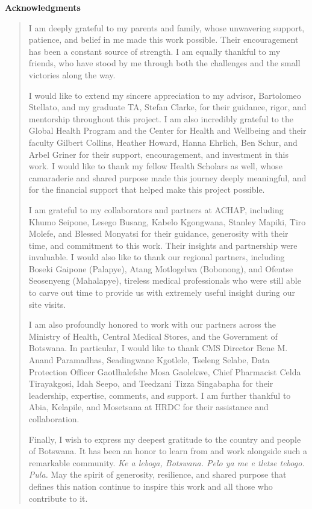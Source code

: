\documentclass{article}
\begin{document}
\begin{center}
\small
\textbf{Acknowledgments}
\end{center}
\begin{quote}
\small
I am deeply grateful to my parents and family, whose unwavering support, patience, and belief in me made this work possible. Their encouragement has been a constant source of strength. I am equally thankful to my friends, who have stood by me through both the challenges and the small victories along the way.

I would like to extend my sincere appreciation to my advisor, Bartolomeo Stellato, and my graduate TA, Stefan Clarke, for their guidance, rigor, and mentorship throughout this project. I am also incredibly grateful to the Global Health Program and the Center for Health and Wellbeing and their faculty Gilbert Collins, Heather Howard, Hanna Ehrlich, Ben Schur, and Arbel Griner for their support, encouragement, and investment in this work. I would like to thank my fellow Health Scholars as well, whose camaraderie and shared purpose made this journey deeply meaningful, and for the financial support that helped make this project possible.

I am grateful to my collaborators and partners at ACHAP, including Khumo Seipone, Lesego Busang, Kabelo Kgongwana, Stanley Mapiki, Tiro Molefe, and Blessed Monyatsi for their guidance, generosity with their time, and commitment to this work. Their insights and partnership were invaluable. I would also like to thank our regional partners, including Boseki Gaipone (Palapye), Atang Motlogelwa (Bobonong), and Ofentse Seosenyeng (Mahalapye), tireless medical professionals who were still able to carve out time to provide us with extremely useful insight during our site visits.

I am also profoundly honored to work with our partners across the Ministry of Health, Central Medical Stores, and the Government of Botswana. In particular, I would like to thank CMS Director Bene M. Anand Paramadhas, Seadingwane Kgotlele, Tseleng Selabe, Data Protection Officer Gaotlhalefshe Mosa Gaolekwe, Chief Pharmacist Celda Tirayakgosi, Idah Seepo, and Teedzani Tizza Singabapha for their leadership, expertise, comments, and support. I am further thankful to Abia, Kelapile, and Mosetsana at HRDC for their assistance and collaboration.

Finally, I wish to express my deepest gratitude to the country and people of Botswana. It has been an honor to learn from and work alongside such a remarkable community. \textit{Ke a leboga, Botswana. Pelo ya me e tletse tebogo. Pula.} May the spirit of generosity, resilience, and shared purpose that defines this nation continue to inspire this work and all those who contribute to it. 
\end{quote}
\vspace{1em}
\end{document}
